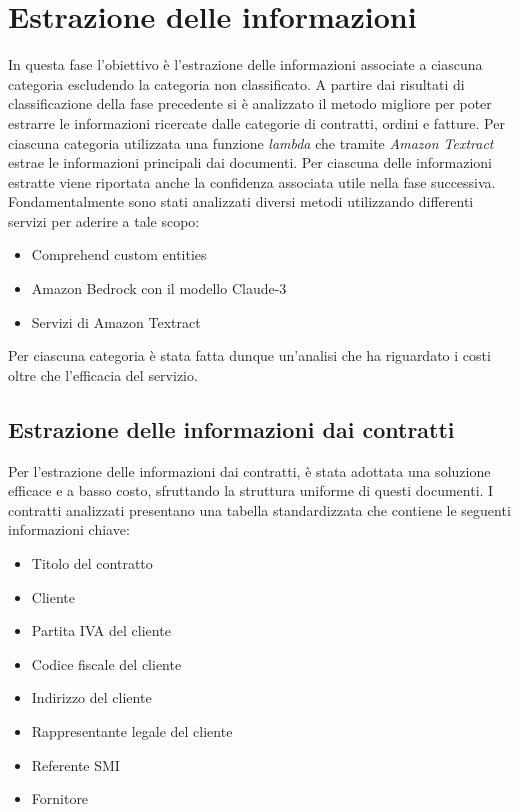 \section{Estrazione delle informazioni}
In questa fase l'obiettivo è l'estrazione delle informazioni associate a ciascuna categoria escludendo la categoria non classificato. A partire dai risultati di classificazione della fase precedente si è analizzato il metodo migliore per poter estrarre le informazioni ricercate dalle categorie di contratti, ordini e fatture. Per ciascuna categoria
utilizzata una funzione \emph{lambda} che tramite \emph{Amazon Textract} estrae le informazioni
principali dai documenti. Per ciascuna delle informazioni estratte viene riportata
anche la confidenza associata utile nella fase successiva.\\
Fondamentalmente sono stati analizzati diversi metodi utilizzando differenti servizi per aderire a tale scopo:
\begin{itemize}
    \item Comprehend custom entities
    \item Amazon Bedrock con il modello Claude-3
    \item Servizi di Amazon Textract
\end{itemize}
Per ciascuna categoria è stata fatta dunque un'analisi che ha riguardato i costi oltre che l'efficacia del servizio.\\
\subsection{Estrazione delle informazioni dai contratti}
\label{subsec:estrazione-contratti}
Per l'estrazione delle informazioni dai contratti, è stata adottata una soluzione efficace e a basso costo, sfruttando la struttura uniforme di questi documenti. I contratti analizzati presentano una tabella standardizzata che contiene le seguenti informazioni chiave:

\begin{itemize}
    \item Titolo del contratto
    \item Cliente
    \item Partita IVA del cliente
    \item Codice fiscale del cliente
    \item Indirizzo del cliente
    \item Rappresentante legale del cliente
    \item Referente SMI
    \item Fornitore
\end{itemize}

